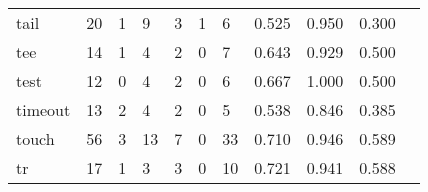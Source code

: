 \begin{longtable}{lp{1.20cm}p{1.20cm}p{1.20cm}p{1.20cm}p{1.20cm}p{1.20cm}p{1.20cm}p{1.20cm}p{1.20cm}p{1.20cm}}
tail      &                                    20 &                                                  1 &                                                  9 &                                                  3 &                                                  1 &                                                  6 &                                         0.525 &                                              0.950 &                                              0.300 \\
tee       &                                    14 &                                                  1 &                                                  4 &                                                  2 &                                                  0 &                                                  7 &                                         0.643 &                                              0.929 &                                              0.500 \\
test      &                                    12 &                                                  0 &                                                  4 &                                                  2 &                                                  0 &                                                  6 &                                         0.667 &                                              1.000 &                                              0.500 \\
timeout   &                                    13 &                                                  2 &                                                  4 &                                                  2 &                                                  0 &                                                  5 &                                         0.538 &                                              0.846 &                                              0.385 \\
touch     &                                    56 &                                                  3 &                                                 13 &                                                  7 &                                                  0 &                                                 33 &                                         0.710 &                                              0.946 &                                              0.589 \\
tr        &                                    17 &                                                  1 &                                                  3 &                                                  3 &                                                  0 &                                                 10 &                                         0.721 &                                              0.941 &                                              0.588 \\

\end{longtable}
